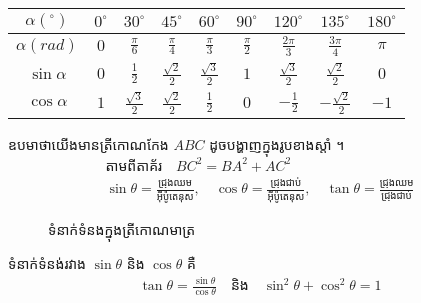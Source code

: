 \begin{center}
	\begin{tabular}{ | c | c | c | c | c | c | c | c | c | }
		\hline
		$\alpha\left(^\circ\right)$ & $0^\circ$ & $30^\circ$ & $45^\circ$ & $60^\circ$ & $90^\circ$ & $120^\circ$ & $135^\circ$ & $180^\circ$\\ \hline
		$\alpha\left(rad\right)$ & $0$ & $\frac{\pi}{6}$ & $\frac{\pi}{4}$ & $\frac{\pi}{3}$ & $\frac{\pi}{2}$ & $\frac{2\pi}{3}$ & $\frac{3\pi}{4}$ & $\pi$\\ \hline
		$\sin\alpha$ & $0$ & $\frac{1}{2}$ & $\frac{\sqrt{2}}{2}$ & $\frac{\sqrt{3}}{2}$ & $1$ & $\frac{\sqrt{3}}{2}$ & $\frac{\sqrt{2}}{2}$ & $0$\\ \hline
		$\cos\alpha$ & $1$ & $\frac{\sqrt{3}}{2}$ & $\frac{\sqrt{2}}{2}$ & $\frac{1}{2}$ & $0$ & $-\frac{1}{2}$ &$-\frac{\sqrt{2}}{2}$ & $-1$ \\
		\hline
	\end{tabular}
\end{center}
\begin{multicols}{2}
	ឧបមាថាយើងមានត្រីកោណកែង $ABC$ ដូចបង្ហាញក្នុងរូបខាងស្តាំ ។
	\begin{align*}
	\text{តាមពីតាគ័រ}\quad BC^{2}=BA^{2}+AC^{2}\\
	\sin\theta=\frac{\text{ជ្រុងឈម}}{\text{អុីប៉ូតេនុស}},\quad \cos\theta=\frac{\text{ជ្រុងជាប់}}{\text{អុីប៉ូតេនុស}},\quad \tan\theta=\frac{\text{ជ្រុងឈម}}{\text{ជ្រុងជាប់}}
	\end{align*}
	\begin{figure}[H]
		\centering
		\caption{ ទំនាក់ទំនងក្នុងត្រីកោណមាត្រ}
	\end{figure}
\end{multicols}
ទំនាក់ទំនង់រវាង $\sin\theta$ និង $\cos\theta$ គឺ
\begin{align*}
\tan\theta=\frac{\sin\theta}{\cos\theta} \quad \text{និង}\quad \sin^{2}\theta+\cos^{2}\theta=1
\end{align*}
\newpage
